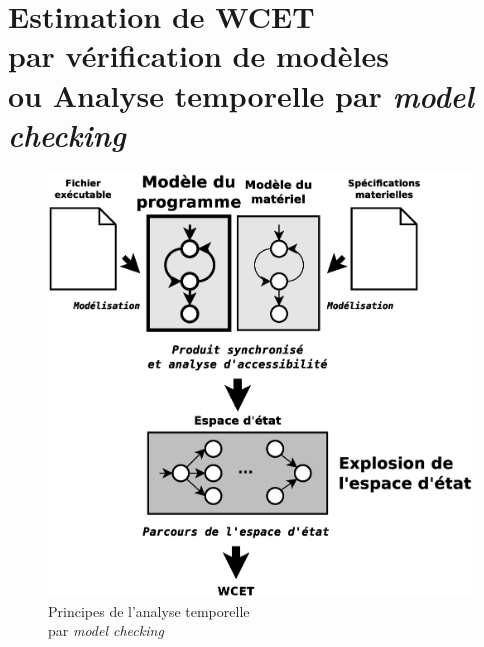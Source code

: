 \documentclass[final]{beamer}
\begin{document}
\begin{frame}
\begin{columns}[t]
      \begin{column}{.45\linewidth}
        \section{Estimation de WCET \\
          par vérification de modèles \\
          {\small ou Analyse temporelle par \emph{model checking}}}
        \begin{figure}
          \centering
          \captionsetup{justification=centering}
          \includegraphics[scale=.66]{img/model-checking.eps}
          \caption{Principes de l'analyse temporelle \\
            par \emph{model checking}}
          \label{fig:analyse}
        \end{figure}
      \end{column}
    \end{columns}

    \vspace{1cm}

\end{frame}
\end{document}
